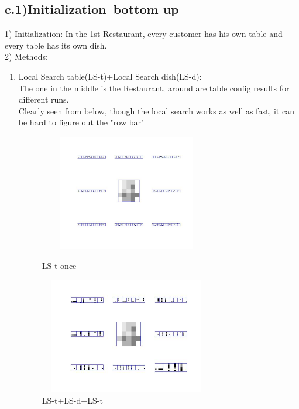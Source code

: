 \documentclass{article}
\begin{document}
\begin{spacing}{1.1}
\subsection{c.1)Initialization--bottom up}
1) Initialization: In the 1st Restaurant, every customer has his own table and every table has its own dish.\\
2) Methods:\\
\begin{enumerate}
\item Local Search table(LS-t)+Local Search dish(LS-d):\\
The one in the middle is the Restaurant, around are table config results for different runs.\\
Clearly seen from below, though the local search works as well as fast, it can be hard to figure out the "row bar"
\begin{figure}[h] 
  \begin{minipage}[b]{0.5\textwidth} 
    \centering 
    \includegraphics[width=3in,height=2in]{bu_lt.jpg} 
    \caption{LS-t once} 
    \label{fig:by:table} 
  \end{minipage}%
  \begin{minipage}[b]{0.5\textwidth} 
    \centering 
    \includegraphics[width=3in,height=2in]{bu_lt_lk.jpg} 
    \caption{LS-t+LS-d+LS-t}
    \label{fig:by:table}  
   \end{minipage}%
\end{figure}
\begin{figure}[h] 
  \begin{minipage}[b]{0.5\textwidth} 

\end{minipage}
\end{figure}
\end{enumerate}
\end{spacing}
\end{document}
